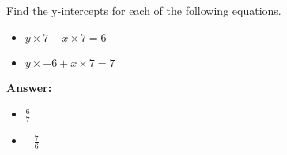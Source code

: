  Find the y-intercepts for each of the following equations. \begin{itemize}\item \( y \times 7 + x \times 7 = 6 \)\item \( y \times -6 + x \times 7 = 7 \)\end{itemize}

        \textbf{Answer:} \begin{itemize}\item \( \frac{6}{7} \)\item \( -\frac{7}{6} \)\end{itemize}
